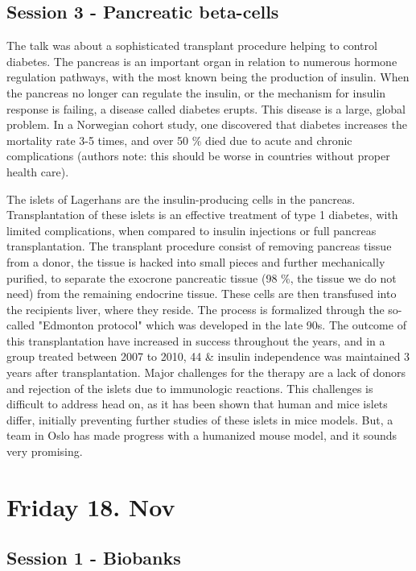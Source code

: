 \documentclass[12p]{article}
\begin{document}
\subsection*{Session 3 - Pancreatic beta-cells}

The talk was about a sophisticated transplant procedure helping to control diabetes.
The pancreas is an important organ in relation to numerous hormone regulation pathways, with the most known being the production of insulin.
When the pancreas no longer can regulate the insulin, or the mechanism for insulin response is failing, a disease called diabetes erupts.
This disease is a large, global problem.
In a Norwegian cohort study, one discovered that diabetes increases the mortality rate 3-5 times, and over 50 \% died due to acute and chronic complications (authors note: this should be worse in countries without proper health care).

The islets of Lagerhans are the insulin-producing cells in the pancreas.
Transplantation of these islets is an effective treatment of type 1 diabetes, with limited complications, when compared to insulin injections or full pancreas transplantation.
The transplant procedure consist of removing pancreas tissue from a donor, the tissue is hacked into small pieces and further mechanically purified, to separate the exocrone pancreatic tissue (98 \%, the tissue we do not need) from the remaining endocrine tissue.
These cells are then transfused into the recipients liver, where they reside.
The process is formalized through the so-called "Edmonton protocol" which was developed in the late 90s.
The outcome of this transplantation have increased in success throughout the years, and in a group treated between 2007 to 2010, 44 \& insulin independence was maintained 3 years after transplantation.
Major challenges for the therapy are a lack of donors and rejection of the islets due to immunologic reactions.
This challenges is difficult to address head on, as it has been shown that human and mice islets differ, initially preventing further studies of these islets in mice models.
But, a team in Oslo has made progress with a humanized mouse model, and it sounds very promising. 


\section*{Friday 18. Nov}

\subsection*{Session 1 - Biobanks}
\end{document}
